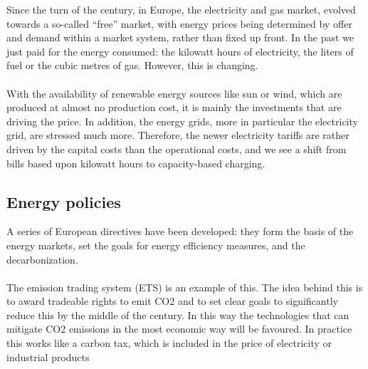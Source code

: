\documentclass[../summary.tex]{subfiles}
\begin{document}
	 Since the turn of the century, in Europe, the electricity and gas market, evolved towards a so-called “free” market, with energy prices being determined by offer and demand within a market system, rather than fixed up front. In the past we just paid for the energy consumed: the kilowatt hours of electricity, the liters of fuel or the cubic metres of gas. However, this is changing.
	\\\\
	With the availability of renewable energy sources like sun or wind, which are produced at almost no production cost, it is mainly the investments that are driving the price. In addition, the energy grids, more in particular the electricity grid, are stressed much more. Therefore, the newer electricity tariffs are rather driven by the capital costs than the operational costs, and we see a shift from bills based upon kilowatt hours to capacity-based charging. 
	
	\subsection{Energy policies}
	
	A series of European directives have been developed: they form the basis of the energy markets, set the goals for energy efficiency measures, and the decarbonization. 
	\\\\
	The emission trading system (ETS) is an example of this. The idea behind this is to award tradeable rights to emit CO2 and to set clear goals to significantly reduce this by the middle of the century. In this way the technologies that can mitigate CO2 emissions in the most economic way will be favoured. In practice this works like a carbon tax, which is included in the price of electricity or industrial products
	
\end{document}
